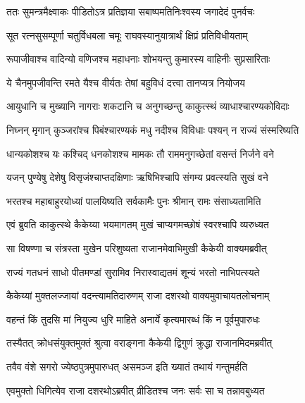 
\twolineshloka
{ततः सुमन्त्रमैक्ष्वाकः पीडितोऽत्र प्रतिज्ञया}
{सबाष्पमतिनिःश्वस्य जगादेदं पुनर्वचः} %

\twolineshloka
{सूत रत्नसुसम्पूर्णा चतुर्विधबला चमूः}
{राघवस्यानुयात्रार्थं क्षिप्रं प्रतिविधीयताम्} %

\twolineshloka
{रूपाजीवाश्च वादिन्यो वणिजश्च महाधनाः}
{शोभयन्तु कुमारस्य वाहिनीः सुप्रसारिताः} %

\twolineshloka
{ये चैनमुपजीवन्ति रमते यैश्च वीर्यतः}
{तेषां बहुविधं दत्त्वा तानप्यत्र नियोजय} %

\twolineshloka
{आयुधानि च मुख्यानि नागराः शकटानि च}
{अनुगच्छन्तु काकुत्स्थं व्याधाश्चारण्यकोविदाः} %

\twolineshloka
{निघ्नन् मृगान् कुञ्जरांश्च पिबंश्चारण्यकं मधु}
{नदीश्च विविधाः पश्यन् न राज्यं संस्मरिष्यति} %

\twolineshloka
{धान्यकोशश्च यः कश्चिद् धनकोशश्च मामकः}
{तौ राममनुगच्छेतां वसन्तं निर्जने वने} %

\twolineshloka
{यजन् पुण्येषु देशेषु विसृजंश्चाप्तदक्षिणाः}
{ऋषिभिश्चापि संगम्य प्रवत्स्यति सुखं वने} %

\twolineshloka
{भरतश्च महाबाहुरयोध्यां पालयिष्यति}
{सर्वकामैः पुनः श्रीमान् रामः संसाध्यतामिति} %

\twolineshloka
{एवं ब्रुवति काकुत्स्थे कैकेय्या भयमागतम्}
{मुखं चाप्यगमच्छोषं स्वरश्चापि व्यरुध्यत} %

\twolineshloka
{सा विषण्णा च संत्रस्ता मुखेन परिशुष्यता}
{राजानमेवाभिमुखी कैकेयी वाक्यमब्रवीत्} %

\twolineshloka
{राज्यं गतधनं साधो पीतमण्डां सुरामिव}
{निरास्वाद्यतमं शून्यं भरतो नाभिपत्स्यते} %

\twolineshloka
{कैकेय्यां मुक्तलज्जायां वदन्त्यामतिदारुणम्}
{राजा दशरथो वाक्यमुवाचायतलोचनाम्} %

\twolineshloka
{वहन्तं किं तुदसि मां नियुज्य धुरि माहिते}
{अनार्ये कृत्यमारब्धं किं न पूर्वमुपारुधः} %

\twolineshloka
{तस्यैतत् क्रोधसंयुक्तमुक्तं श्रुत्वा वराङ्गना}
{कैकेयी द्विगुणं क्रुद्धा राजानमिदमब्रवीत्} %

\twolineshloka
{तवैव वंशे सगरो ज्येष्ठपुत्रमुपारुधत्}
{असमञ्ज इति ख्यातं तथायं गन्तुमर्हति} %

\twolineshloka
{एवमुक्तो धिगित्येव राजा दशरथोऽब्रवीत्}
{व्रीडितश्च जनः सर्वः सा च तन्नावबुध्यत} %

